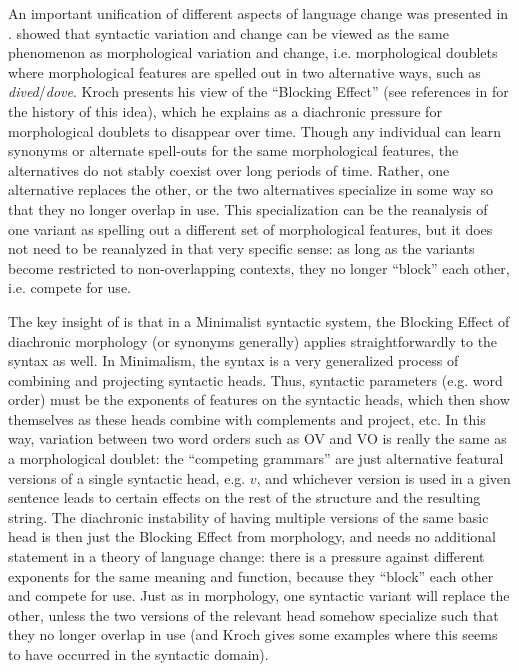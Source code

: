 An important unification of different aspects of language change was presented in \citet{kroch1994}.
\citet{kroch1994} showed that syntactic variation and change can be viewed as the same phenomenon as morphological variation and change, i.e. morphological doublets where morphological features are spelled out in two alternative ways, such as \textsl{dived}/\textsl{dove}.
Kroch presents his view of the ``Blocking Effect'' (see references in \citealt{kroch1994} for the history of this idea), which he explains as a diachronic pressure for morphological doublets to disappear over time.
Though any individual can learn synonyms or alternate spell-outs for the same morphological features, the alternatives do not stably coexist over long periods of time.
Rather, one alternative replaces the other, or the two alternatives specialize in some way so that they no longer overlap in use.
This specialization can be the reanalysis of one variant as spelling out a different set of morphological features, but it does not need to be reanalyzed in that very specific sense: as long as the variants become restricted to non-overlapping contexts, they no longer ``block'' each other, i.e. compete for use.

The key insight of \citet{kroch1994} is that in a Minimalist syntactic system, the Blocking Effect of diachronic morphology (or synonyms generally) applies straightforwardly to the syntax as well.
In Minimalism, the syntax is a very generalized process of combining and projecting syntactic heads.
Thus, syntactic parameters (e.g. word order) must be the exponents of features on the syntactic heads, which then show themselves as these heads combine with complements and project, etc.
In this way, variation between two word orders such as OV and VO is really the same as a morphological doublet: the ``competing grammars'' \citep{kroch1989} are just alternative featural versions of a single syntactic head, e.g. $v$, and whichever version is used in a given sentence leads to certain effects on the rest of the structure and the resulting string.
The diachronic instability of having multiple versions of the same basic head is then just the Blocking Effect from morphology, and needs no additional statement in a theory of language change: there is a pressure against different exponents for the same meaning and function, because they ``block'' each other and compete for use.
Just as in morphology, one syntactic variant will replace the other, unless the two versions of the relevant head somehow specialize such that they no longer overlap in use (and Kroch gives some examples where this seems to have occurred in the syntactic domain).


